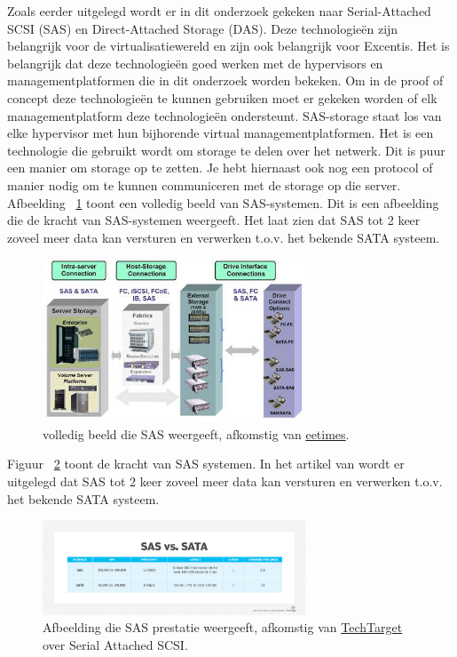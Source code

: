 Zoals eerder uitgelegd wordt er in dit onderzoek gekeken naar Serial-Attached SCSI (SAS) en Direct-Attached Storage (DAS). Deze technologieën zijn belangrijk voor de virtualisatiewereld en zijn ook belangrijk voor Excentis. Het is belangrijk dat deze technologieën goed werken met de hypervisors en managementplatformen die in dit onderzoek worden bekeken.
Om in de proof of concept deze technologieën te kunnen gebruiken moet er gekeken worden of elk managementplatform deze technologieën ondersteunt.
SAS-storage staat los van elke hypervisor met hun bijhorende virtual managementplatformen. Het is een technologie die gebruikt wordt om storage te delen over het netwerk. Dit is puur een manier om storage op te zetten. Je hebt hiernaast ook nog een protocol of manier nodig om te kunnen communiceren met de storage op die server.
Afbeelding ~\ref{fig:sas} toont een volledig beeld van SAS-systemen. Dit is een afbeelding die de kracht van SAS-systemen weergeeft. Het laat zien dat SAS tot 2 keer zoveel meer data kan versturen en verwerken t.o.v. het bekende SATA systeem.
\begin{figure}[h!]
    \centering
    \includegraphics[width=0.7\textwidth]{../onderzoek/storagesas-das.jpg} 
    \caption{volledig beeld die SAS weergeeft, afkomstig van \href{https://www.eetimes.com/serial-attached-scsi-storage-moves-ahead-in-network-server-designs/}{eetimes}.}
    \label{fig:sas}
\end{figure}

\FloatBarrier
Figuur ~\ref{fig:saspres} toont de kracht van SAS systemen. In het artikel van \textcite{loshin2022sas} wordt er uitgelegd dat SAS tot 2 keer zoveel meer data kan versturen en verwerken t.o.v. het bekende SATA systeem.

\begin{figure}[h!]
    \centering
    \includegraphics[width=0.7\textwidth]{../onderzoek/sas_vs_sata-f.png} 
    \caption{Afbeelding die SAS prestatie weergeeft, afkomstig van \href{https://www.techtarget.com/searchstorage/definition/serial-attached-SCSI}{TechTarget} over Serial Attached SCSI.}
    \label{fig:saspres}
\end{figure}


